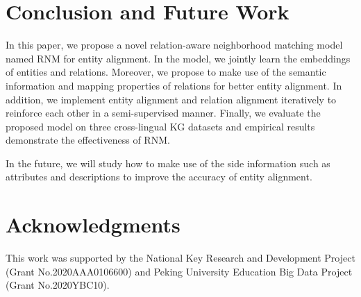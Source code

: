 \documentclass[letterpaper]{article} %
\begin{document}
\section{Conclusion and Future Work}

In this paper, we propose a novel relation-aware neighborhood
matching model named RNM for entity alignment. In the model,
we jointly learn the embeddings of entities and relations.
Moreover, we propose to make use of the semantic information
and mapping properties of relations for better entity alignment.
In addition, we implement entity
alignment and relation alignment iteratively to reinforce each other 
in a semi-supervised manner. Finally, we evaluate
the proposed model on three cross-lingual KG datasets and empirical
results demonstrate the effectiveness of RNM.

In the future, we will study how to make use of the side information such as 
attributes \cite{zhang2019multi} and descriptions \cite{yang2019aligning}
to improve the accuracy of entity alignment. 


\section{Acknowledgments}

This work was supported by the National Key Research and 
Development Project (Grant No.2020AAA0106600) and 
Peking University Education Big Data Project (Grant No.2020YBC10).



\end{document}
